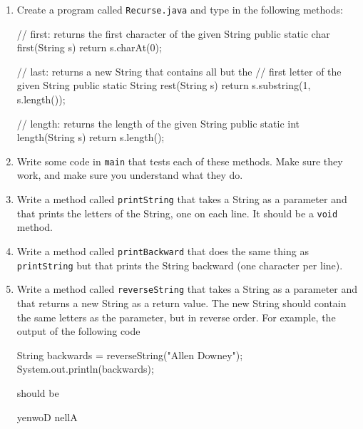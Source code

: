 \begin{exercise}
\begin{enumerate}

\item Create a program called {\tt Recurse.java} and
type in the following methods:

\begin{code}
    // first: returns the first character of the given String
    public static char first(String s) {
        return s.charAt(0);
    }

    // last: returns a new String that contains all but the
    // first letter of the given String
    public static String rest(String s) {
        return s.substring(1, s.length());
    }

    // length: returns the length of the given String
    public static int length(String s) {
        return s.length();
    }
\end{code}

\item Write some code in {\tt main} that tests each of these
methods.  Make sure they work, and make sure you understand
what they do.

\item Write a method called {\tt printString} that takes a
String as a parameter and that prints the letters of the
String, one on each line.  It should be a {\tt void} method.

\item Write a method called {\tt printBackward} that does
the same thing as {\tt printString} but that prints the String
backward (one character per line).

\item Write a method called {\tt reverseString} that takes
a String as a parameter and that returns a new String as a
return value.  The new String should contain the same letters
as the parameter, but in reverse order.  For example, the
output of the following code

\begin{code}
    String backwards = reverseString("Allen Downey");
    System.out.println(backwards);
\end{code}

should be

\begin{stdout}
yenwoD nellA
\end{stdout}

\end{enumerate}
\end{exercise}


